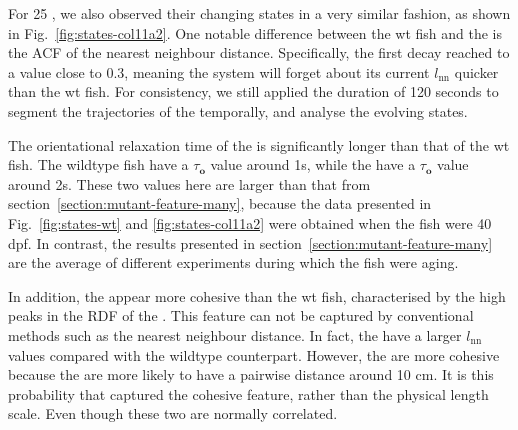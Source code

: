 \documentclass[11pt,twoside]{report}
\begin{document}
For 25 {\mf}, we also observed their changing states in a very similar fashion, as shown in Fig.~\ref{fig:states-col11a2}. One notable difference between the wt fish and the {\mf} is the ACF of the nearest neighbour distance. Specifically, the first decay reached to a value close to 0.3, meaning the system will forget about its current $l_\mathrm{nn}$ quicker than the wt fish. For consistency, we still applied the duration of 120 seconds to segment the trajectories of the {\mf} temporally, and analyse the evolving states.

The orientational relaxation time of the {\mf} is significantly longer than that of the wt fish. The wildtype fish have a $\tau_\mathbf{o}$ value around 1s, while the {\mf} have a $\tau_\mathbf{o}$ value around 2s. These two values here are larger than that from section~\ref{section:mutant-feature-many}, because the data presented in Fig.~\ref{fig:states-wt} and \ref{fig:states-col11a2} were obtained when the fish were 40 dpf. In contrast, the results presented in section~\ref{section:mutant-feature-many} are the average of different experiments during which the fish were aging.

In addition, the {\mf} appear more cohesive than the wt fish, characterised by the high peaks in the RDF of the {\mf}. This feature can not be captured by conventional methods such as the nearest neighbour distance. In fact, the {\mf} have a larger $l_\mathrm{nn}$ values compared with the wildtype counterpart. However, the {\mf} are more cohesive because the are more likely to have a pairwise distance around 10 cm. It is this probability that captured the cohesive feature, rather than the physical length scale. Even though these two are normally correlated.
\end{document}
